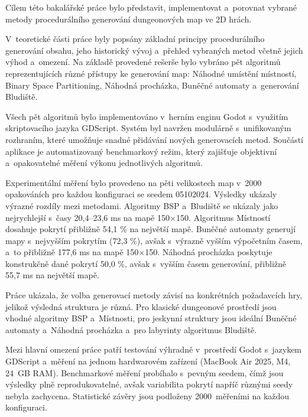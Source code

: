 \documentclass[
   program=itk,
   biblatex,
   figures=true,
   tables=true,
   glossaries,
   index
]{kidiplom}
\begin{document}
\begin{kiconclusions}
Cílem této bakalářské práce bylo představit, implementovat a~porovnat vybrané metody procedurálního generování dungeonových map ve 2D hrách.

V~teoretické části práce byly popsány základní principy procedurálního generování obsahu, jeho historický vývoj a~přehled vybraných metod včetně jejich výhod a~omezení. Na základě provedené rešerše bylo vybráno pět algoritmů reprezentujících různé přístupy ke generování map: Náhodné umístění místností, Binary Space Partitioning, Náhodná procházka, Buněčné automaty a~generování Bludiště.

Všech pět algoritmů bylo implementováno v~herním enginu Godot s~využitím skriptovacího jazyka GDScript. Systém byl navržen modulárně s~unifikovaným rozhraním, které umožňuje snadné přidávání nových generovacích metod. Součástí aplikace je automatizovaný benchmarkový režim, který zajišťuje objektivní a~opakovatelné měření výkonu jednotlivých algoritmů.

Experimentální měření bylo provedeno na pěti velikostech map v~2000 opakováních pro každou konfiguraci se seedem 05102024. Výsledky ukázaly výrazné rozdíly mezi metodami. Algoritmy BSP a~Bludiště se ukázaly jako nejrychlejší s~časy 20,4--23,6 ms na mapě 150$\times$150. Algoritmus Místností dosahuje pokrytí přibližně 54,1 \% na největší mapě. Buněčné automaty generují mapy s~nejvyšším pokrytím (72,3 \%), avšak s~výrazně vyšším výpočetním časem, a~to přibližně 177,6 ms na mapě 150$\times$150. Náhodná procházka poskytuje konstrukčně dané pokrytí 50,0 \%, avšak s~vyšším časem generování, přibližně 55,7 ms na největší mapě.

Práce ukázala, že volba generovací metody závisí na konkrétních požadavcích hry, jelikož výsledná struktura je různá. Pro klasické dungeonové prostředí jsou vhodné algoritmy BSP a~Místnosti, pro jeskynní struktury jsou ideální Buněčné automaty a~Náhodná procházka a~pro labyrinty algoritmus Bludiště.

Mezi hlavní omezení práce patří testování výhradně v~prostředí Godot s~jazykem GDScript a~měření na jednom hardwarovém zařízení (MacBook Air 2025, M4, 24~GB RAM). Benchmarkové měření probíhalo s~pevným seedem, čímž jsou výsledky plně reprodukovatelné, avšak variabilita pokrytí napříč různými seedy nebyla zachycena. Statistické závěry jsou podloženy 2000~měřeními na každou konfiguraci.
\end{kiconclusions}
\end{document}
